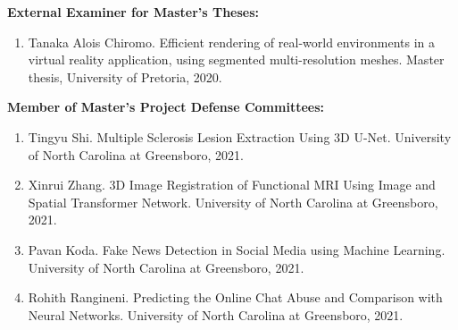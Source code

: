 \documentclass[wideaddress]{vitae}
\newcommand{\resitem}[1]{
	\item \begin{flushleft} #1 \end{flushleft}
}
\newenvironment{resnumberedlist}[1]{
	\resitem{\textbf{#1}}
	\begin{enumerate}
}{
	\end{enumerate}
}
\begin{document}
\begin{description}
	\begin{resnumberedlist}{External Examiner for Master's Theses:}
	\resitem{Tanaka Alois Chiromo. Efficient rendering of real-world environments in a virtual reality application, using segmented multi-resolution meshes. Master thesis, University of Pretoria, 2020.}
	\end{resnumberedlist}

    \begin{resnumberedlist}{Member of Master's Project Defense Committees:}
	\resitem{Tingyu Shi. Multiple Sclerosis Lesion Extraction Using 3D U-Net. University of North Carolina at Greensboro, 2021.}
	\resitem{Xinrui Zhang. 3D Image Registration of Functional MRI Using Image and Spatial Transformer Network. University of North Carolina at Greensboro, 2021.}
	\resitem{Pavan Koda. Fake News Detection in Social Media using Machine Learning. University of North Carolina at Greensboro, 2021.}
	\resitem{Rohith Rangineni. Predicting the Online Chat Abuse and Comparison with Neural Networks. University of North Carolina at Greensboro, 2021.}

    \end{resnumberedlist}
    

\end{description}
\end{document}

